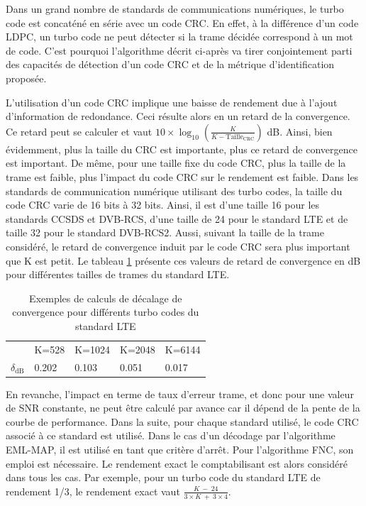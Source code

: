 Dans un grand nombre de standards de communications numériques, le turbo code est concaténé en série avec un code CRC. En 
effet, à la différence d'un code LDPC, un turbo code ne peut détecter si la trame décidée correspond à un mot de code. 
C'est pourquoi l'algorithme  décrit ci-après va tirer conjointement parti des capacités de détection d'un code CRC et de la métrique 
d'identification proposée.

L'utilisation d'un code CRC implique une baisse de rendement due à l'ajout d'information de redondance. Ceci résulte alors 
en un retard de la convergence. Ce retard peut se calculer et vaut $10\times \log_{10}\left(\frac{K}{K-\text{Taille}_\text{CRC}}\right)$ dB.
Ainsi, bien évidemment, plus la taille du CRC est importante, plus ce retard de convergence est important. De même,
pour une taille fixe du code CRC, plus la taille de la trame est faible, plus l'impact du code CRC sur le rendement est 
faible. Dans les 
standards de communication numérique utilisant des turbo codes, la taille du code CRC varie de 16 bits à 32 bits.
Ainsi, il est d'une taille 16 pour les standards CCSDS et DVB-RCS, d'une taille de 24 pour le standard LTE et de taille
32 pour le standard DVB-RCS2. Aussi, suivant la taille de la trame considéré, le retard de convergence induit par le code 
CRC sera plus important que K est petit. Le tableau \ref{tab:crcShift} présente ces valeurs de retard de convergence en 
dB pour différentes tailles de trames du standard LTE. 

\begin{table}[!b]
    \centering
    \caption{Exemples de calculs de décalage de convergence pour différents turbo codes du standard LTE}
    \label{tab:crcShift}
        \begin{tabular}{rllll}
            \toprule
            		& K=528 & K=1024 & K=2048 & K=6144 \\
            \cmidrule(l){2-2}\cmidrule(l){3-3}\cmidrule(l){4-4}\cmidrule(l){5-5}
            $\delta_\text{dB}$ & 0.202 & 0.103 & 0.051 & 0.017 \\
            \bottomrule
        \end{tabular}%
\end{table}

En revanche, l'impact en terme de taux d'erreur trame, et donc pour une valeur de SNR constante, ne peut être calculé par 
avance car il dépend de la pente de la courbe de performance.
Dans la suite, pour chaque standard utilisé, le code CRC associé à ce standard est utilisé. Dans le cas d'un décodage par l'algorithme 
EML-MAP, il est utilisé en tant que critère d'arrêt. Pour l'algorithme FNC, son emploi est nécessaire. Le rendement exact
le comptabilisant est alors considéré dans tous les cas. Par exemple, pour un turbo code du standard LTE
de rendement 1/3, le rendement exact vaut  $\frac{K~-~24}{3\times K~+~3\times 4}$.

